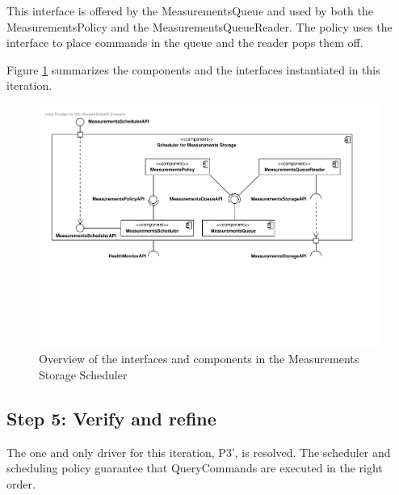 \npar This interface is offered by the MeasurementsQueue and used by both the
MeasurementsPolicy and the MeasurementsQueueReader. The policy uses the
interface to place commands in the queue and the reader pops them off.

\npar Figure \ref{fig:it3/interfaces} summarizes the components and the
interfaces instantiated in this iteration.

\begin{figure}[H]
	\begin{centering}
		\includegraphics[width=\textwidth]{figs/add-it3-interfaces.pdf}
		\caption{Overview of the interfaces and components in the Measurements Storage
		Scheduler}
		\label{fig:it3/interfaces}
	\end{centering}
\end{figure}

\subsection{Step 5: Verify and refine}
\label{add:it3/verification}

\npar The one and only driver for this iteration, P3', is resolved. The
scheduler and scheduling policy guarantee that QueryCommands are executed in the
right order.